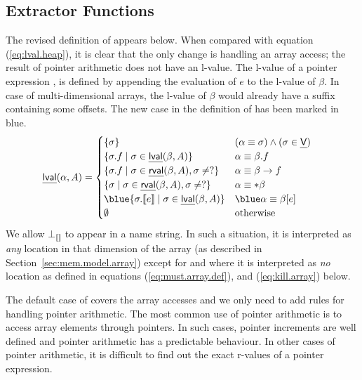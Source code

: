 \documentclass[a4paper,11pt,fleqn]{article}
\newcommand{\var}{\text{\sf\em V\/}\xspace}
\newcommand{\must}{\text{\sf\em Must\/}\xspace}
\newcommand{\Kill}{\text{{\sf\em Kill}}\xspace}
\newcommand{\eval}[1]{\text{$\llbracket{#1}\rrbracket$}}
\begin{document}
\subsection{Extractor Functions}

The revised definition of \lval appears below. When compared with
equation (\ref{eq:lval.heap}), it is clear that the only change is
handling an array access; the result of pointer arithmetic does not have
an l-value. The l-value of a pointer
expression \text{$\beta[e]$}, is defined by appending the evaluation of
$e$ to the l-value of $\beta$. In case of multi-dimensional arrays, the
l-value of $\beta$ would already have a suffix containing some offsets.
The new case in the definition of \lval has been marked in blue.
\begin{align}
\lval(\alpha,A) & =  
		\begin{cases}
		\{ \sigma \} 	
				& (\alpha \equiv \sigma) \wedge (\sigma \in \var)
			\\
		\{ \sigma.f \mid \sigma \in \lval(\beta,A) \} 
				& \alpha \equiv \beta.f
			\\
		\left\{ \sigma.f \mid \sigma \in \rval(\beta,A), \sigma \neq ? \right\}
				& \alpha \equiv \beta\rightarrow f
			\\
		\left\{ \sigma \mid \sigma \in \rval(\beta,A), \sigma \neq ? \right\}
				& \alpha \equiv *\beta
			\\
			\blue
		\{ \sigma.\eval{e} \mid \sigma \in \lval(\beta,A) \} 
				& 
			\blue
				\alpha \equiv \beta[e]
			\\
\emptyset	& \text{otherwise}
		\end{cases}
\end{align}
We allow $\bot_\eval{}$ to appear in a name string. In such a situation, it 
is interpreted as {\em any\/} location in that dimension of the array (as described
in Section~\ref{sec:mem.model.array}) except for \must and \Kill where
it is interpreted as {\em no\/} location as defined in equations
(\ref{eq:must.array.def}), and (\ref{eq:kill.array}) below.

The default case of \rval covers the array accesses and we only need
to add rules for handling pointer arithmetic. The most common use of
pointer arithmetic is to access array elements through pointers. In
such cases, pointer increments are well defined and pointer arithmetic
has a predictable behaviour. In other cases of pointer arithmetic, it is
difficult to find out the exact r-values of a pointer expression.
\end{document}
